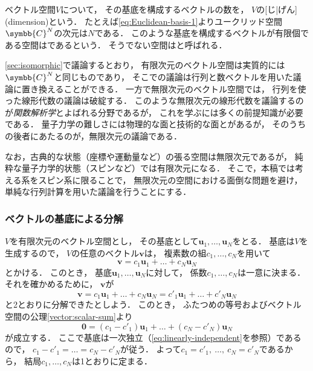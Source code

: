 \documentclass[
]{sotsu}
\begin{document}
ベクトル空間$V$について，
その基底を構成するベクトルの数を，
$V$の[じ|げん](dimension)という．
たとえば\cref{eq:Euclidean-basis-1}よりユークリッド空間$\symbb{C}^N$の次元は$N$である．
このような基底を構成するベクトルが有限個である空間はであるという．
そうでない空間はと呼ばれる．

\cref{sec:isomorphic}で議論するとおり，
有限次元のベクトル空間は実質的には$\symbb{C}^N$と同じものであり，
そこでの議論は行列と数ベクトルを用いた議論に置き換えることができる．
一方で無限次元のベクトル空間では，
行列を使った線形代数の議論は破綻する．
このような無限次元の線形代数を議論するのが\emph{関数解析学}とよばれる分野であるが，
これを学ぶには多くの前提知識が必要である．
量子力学の難しさには物理的な面と技術的な面とがあるが，
そのうちの後者にあたるのが，無限次元の議論である．

なお，古典的な状態（座標や運動量など）の張る空間は無限次元であるが，
純粋な量子力学的状態（スピンなど）では有限次元になる．
そこで，本稿では考える系をスピン系に限ることで，
無限次元の空間における面倒な問題を避け，
単純な行列計算を用いた議論を行うことにする．



\subsubsection{ベクトルの基底による分解}
\label{sec:expansion-of-basis}

$V$を有限次元のベクトル空間とし，
その基底として$\symbf{u}_1, \dots, \symbf{u}_N$をとる．
基底は$V$を生成するので，
$V$の任意のベクトル$\symbf{v}$は，
複素数の組$c_1, \dots, c_N$を用いて
\begin{equation*}
    \symbf{v} = c_1 \symbf{u}_1 + \dots + c_N \symbf{u}_N
\end{equation*}
とかける．
このとき，
基底$\symbf{u}_1, \dots, \symbf{u}_N$に対して，
係数$c_1, \dots, c_N$は一意に決まる．
それを確かめるために，
$\symbf{v}$が
\begin{equation*}
    \symbf{v} = c_1  \symbf{u}_1 + \dots + c_N  \symbf{u}_N
              = c'_1 \symbf{u}_1 + \dots + c'_N \symbf{u}_N
\end{equation*}
と2とおりに分解できたとしよう．
このとき，
ふたつめの等号およびベクトル空間の公理\cref{vector:scalar-sum}より
\begin{equation*}
    \symbf{0} = (c_1 - c'_1) \symbf{u}_1 + \dots + (c_N - c'_N) \symbf{u}_N
\end{equation*}
が成立する．
ここで基底は一次独立（\cref{eq:linearly-independent}を参照）であるので，
$c_1 - c'_1 = \dots = c_N - c'_N$が従う．
よって$c_1 = c'_1, \  \dots, \  c_N = c'_N$であるから，
結局$c_1, \dots, c_N$は1とおりに定まる．
\end{document}
